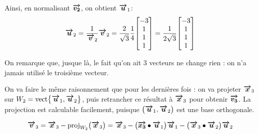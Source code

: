 \documentclass[a4paper]{article}
\begin{document}
{    Ainsi, en normalisant $\bm{\protect\overrightarrow{v_2}}$, on obtient $\bm{\protect\overrightarrow{u}}_1$: 
    \[\bvec{u}_2 = \frac{1}{\bvec{v}_2} \bvec{v}_2 = \frac{2}{\sqrt{3}} \frac{1}{4} \begin{bmatrix} -3 \\ 1 \\ 1 \\ 1 \end{bmatrix} = \frac{1}{2\sqrt{3}} \begin{bmatrix} -3 \\ 1 \\ 1 \\ 1 \end{bmatrix} \]

    On remarque que, jusque là, le fait qu'on ait 3 vecteurs ne change rien : on n'a jamais utilisé le troisième vecteur.


    On va faire le même raisonnement que pour les dernières fois : on va projeter $\bm{\protect\overrightarrow{x}}_3$ sur $W_2 = \vect\left\{\bvec{u}_1, \bvec{u}_2\right\}$, puis retrancher ce résultat à $\bm{\protect\overrightarrow{x}}_3$ pour obtenir $\bm{\protect\overrightarrow{v_3}}$. La projection est calculable facilement, puisque $\left(\bvec{u}_1, \bvec{u}_2\right)$ est une base orthogonale.
    
    \[\bvec{v}_3 = \bvec{x}_3 - \proj_{W_2}\left(\bvec{x}_3\right) = \bvec{x}_3 - \left(\bvec{x_3} \dotprod \bvec{u}_1\right)\bvec{u}_1 - \left(\bvec{x}_3 \dotprod \bvec{u}_2\right)\bvec{u}_2\]

}
\end{document}
